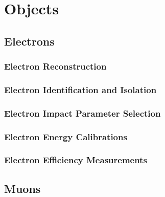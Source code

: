 \section{Objects}
\label{sec:objects}

\subsection{Electrons}

\subsubsection{Electron Reconstruction}
\label{sec:eleReco}


\subsubsection{Electron Identification and Isolation}
\label{sec:eleID}


\subsubsection{Electron Impact Parameter Selection}                                                                                                                                                                                                 
\label{sec:eleSIP}  

%

\subsubsection{Electron Energy Calibrations}


\subsubsection{Electron Efficiency Measurements}
\label{sec:eleEffMeas}


\clearpage

\subsection{Muons}

